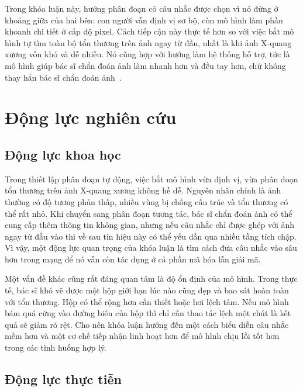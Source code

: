 Trong khóa luận này, hướng phân đoạn có câu nhắc được chọn vì nó đứng ở khoảng giữa của hai bên: con người vẫn định vị sơ bộ, còn mô hình làm phần khoanh chi tiết ở cấp độ pixel. Cách tiếp cận này thực tế hơn so với việc bắt mô hình tự tìm toàn bộ tổn thương trên ảnh ngay từ đầu, nhất là khi ảnh X-quang xương vốn khó và dễ nhiễu. Nó cũng hợp với hướng làm hệ thống hỗ trợ, tức là mô hình giúp bác sĩ chẩn đoán ảnh làm nhanh hơn và đều tay hơn, chứ không thay hẳn bác sĩ chẩn đoán ảnh~\cite{xu2016deepinteractive,wang2019deepigeos,ma2024medsam}.

\section{Động lực nghiên cứu}
\label{sec:dong_luc}

\subsection{Động lực khoa học}

Trong thiết lập phân đoạn tự động, việc bắt mô hình vừa định vị, vừa phân đoạn tổn thương trên ảnh X-quang xương không hề dễ. Nguyên nhân chính là ảnh thường có độ tương phản thấp, nhiều vùng bị chồng cấu trúc và tổn thương có thể rất nhỏ. Khi chuyển sang phân đoạn tương tác, bác sĩ chẩn đoán ảnh có thể cung cấp thêm thông tin không gian, nhưng nếu câu nhắc chỉ được ghép với ảnh ngay từ đầu vào thì về sau tín hiệu này có thể yếu dần qua nhiều tầng tích chập. Vì vậy, một động lực quan trọng của khóa luận là tìm cách đưa câu nhắc vào sâu hơn trong mạng để nó vẫn còn tác dụng ở cả phần mã hóa lẫn giải mã.

Một vấn đề khác cũng rất đáng quan tâm là độ ổn định của mô hình. Trong thực tế, bác sĩ khó vẽ được một hộp giới hạn lúc nào cũng đẹp và bao sát hoàn toàn với tổn thương. Hộp có thể rộng hơn cần thiết hoặc hơi lệch tâm. Nếu mô hình bám quá cứng vào đường biên của hộp thì chỉ cần thao tác lệch một chút là kết quả sẽ giảm rõ rệt. Cho nên khóa luận hướng đến một cách biểu diễn câu nhắc mềm hơn và một cơ chế tiếp nhận linh hoạt hơn để mô hình chịu lỗi tốt hơn trong các tình huống hợp lý.

\subsection{Động lực thực tiễn}

